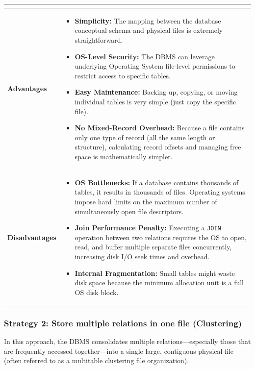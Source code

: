 \documentclass[12pt,a3paper]{article}
\begin{document}
\begin{enumerate}
\begin{tcolorbox}[enhanced,breakable,ansbox,colback=cA!4,colframe=cA,boxrule=0.8pt,arc=5pt,title={\textbf{Answer}},fonttitle=\bfseries\color{white},colbacktitle=cA]
\renewcommand{\arraystretch}{1.4}
\begin{tabularx}{\textwidth}{@{} >{\bfseries}l X @{}}
\toprule
\multicolumn{2}{c}{\textbf{Each Relation in One File}} \\
\midrule
Advantages & 
\vspace{-1.2em}
\begin{itemize}
    \item \textbf{Simplicity:} The mapping between the database conceptual schema and physical files is extremely straightforward.
    \item \textbf{OS-Level Security:} The DBMS can leverage underlying Operating System file-level permissions to restrict access to specific tables.
    \item \textbf{Easy Maintenance:} Backing up, copying, or moving individual tables is very simple (just copy the specific file).
    \item \textbf{No Mixed-Record Overhead:} Because a file contains only one type of record (all the same length or structure), calculating record offsets and managing free space is mathematically simpler.
\end{itemize} \\
\midrule
Disadvantages & 
\vspace{-1.2em}
\begin{itemize}
    \item \textbf{OS Bottlenecks:} If a database contains thousands of tables, it results in thousands of files. Operating systems impose hard limits on the maximum number of simultaneously open file descriptors.
    \item \textbf{Join Performance Penalty:} Executing a \texttt{JOIN} operation between two relations requires the OS to open, read, and buffer multiple separate files concurrently, increasing disk I/O seek times and overhead.
    \item \textbf{Internal Fragmentation:} Small tables might waste disk space because the minimum allocation unit is a full OS disk block.
\end{itemize} \\
\bottomrule
\end{tabularx}

\vspace{1em}

\subsubsection*{Strategy 2: Store multiple relations in one file (Clustering)}
In this approach, the DBMS consolidates multiple relations—especially those that are frequently accessed together—into a single large, contiguous physical file (often referred to as a multitable clustering file organization).


\end{tcolorbox}
\end{enumerate}
\end{document}
